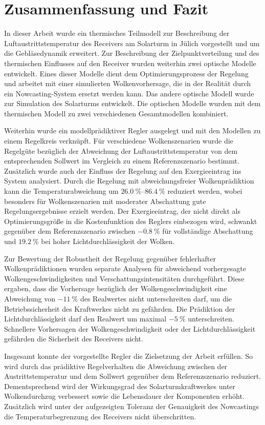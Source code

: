 \chapter{Zusammenfassung und Fazit} \label{ch_Fazit}
In dieser Arbeit wurde ein thermisches Teilmodell zur Beschreibung der Luftaustrittstemperatur des Receivers am Solarturm in Jülich vorgestellt und um die Gebläsedynamik erweitert.
Zur Beschreibung der Zielpunktverteilung und des thermischen Einflusses auf den Receiver wurden weiterhin zwei optische Modelle entwickelt.
Eines dieser Modelle dient dem Optimierungsprozess der Regelung und arbeitet mit einer simulierten Wolkenvorhersage, die in der Realität durch ein Nowcasting-System ersetzt werden kann.
Das andere optische Modell wurde zur Simulation des Solarturms entwickelt.
Die optischen Modelle wurden mit dem thermischen Modell zu zwei verschiedenen Gesamtmodellen kombiniert.

Weiterhin wurde ein modellprädiktiver Regler ausgelegt und mit den Modellen zu einem Regelkreis verknüpft.
Für verschiedene Wolkenszenarien wurde die Regelgüte bezüglich der Abweichung der Luftaustrittstemperatur von dem entsprechenden Sollwert im Vergleich zu einem Referenzszenario bestimmt.
Zusätzlich wurde auch der Einfluss der Regelung auf den Exergieeintrag ins System analysiert.
Durch die Regelung mit abweichungsfreier Wolkenprädiktion kann die Temperaturabweichung um $\SIrange{26.0}{86.4}{\percent}$ reduziert werden, wobei besonders für Wolkenszenarien mit moderater Abschattung gute Regelungsergebnisse erzielt werden.
Der Exergieeintrag, der nicht direkt als Optimierungsgröße in die Kostenfunktion des Reglers einbezogen wird, schwankt gegenüber dem Referenzszenario zwischen $\SI{-0.8}{\percent}$ für vollständige Abschattung und $\SI{+19.2}{\percent}$ bei hoher Lichtdurchlässigkeit der Wolken.

Zur Bewertung der Robustheit der Regelung gegenüber fehlerhafter Wolkenprädiktionen wurden separate Analysen für abweichend vorhergesagte Wolkengeschwindigkeiten und Verschattungsintensitäten durchgeführt.
Diese ergaben, dass die Vorhersage bezüglich der Wolkengeschwindigkeit eine Abweichung von $\SI{-11}{\percent}$ des Realwertes nicht unterschreiten darf, um die Betriebssicherheit des Kraftwerkes nicht zu gefährden.
Die Prädiktion der Lichtdurchlässigkeit darf den Realwert um maximal $\SI{-5}{\percent}$ unterschreiten.
Schnellere Vorhersagen der Wolkengeschwindigkeit oder der Lichtdurchlässigkeit gefährden die Sicherheit des Receivers nicht.

Insgesamt konnte der vorgestellte Regler die Zielsetzung der Arbeit erfüllen.
So wird durch das prädiktive Regelverhalten die Abweichung zwischen der Austrittstemperatur und dem Sollwert gegenüber dem Referenzszenario reduziert.
Dementsprechend wird der Wirkungsgrad des Solarturmkraftwerkes unter Wolkendurchzug verbessert sowie die Lebensdauer der Komponenten erhöht.
Zusätzlich wird unter der aufgezeigten Toleranz der Genauigkeit des Nowcastings die Temperaturbegrenzung des Receivers nicht überschritten.

